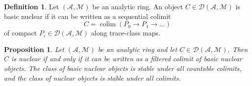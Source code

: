 \documentclass[11pt]{amsbook}
\DeclareMathOperator{\colim}{colim}
\numberwithin{equation}{section}
\numberwithin{theorem}{section}
\newtheorem{proposition}[theorem]{Proposition}
\theoremstyle{definition}
\newtheorem{definition}[theorem]{Definition}
\begin{document}
\begin{definition}\label{def:basicnuclear} Let $(\mathcal A,\mathcal M)$ be an analytic ring. An object $C\in \mathcal D(\mathcal A,\mathcal M)$ is basic nuclear if it can be written as a sequential colimit
\[
C=\colim(P_0\to P_1\to \ldots)
\]
of compact $P_i\in \mathcal D(\mathcal A,\mathcal M)$ along trace-class maps.
\end{definition}

\begin{proposition}\label{prop:nuclear} Let $(\mathcal A,\mathcal M)$ be an analytic ring and let $C\in \mathcal D(\mathcal A,\mathcal M)$. Then $C$ is nuclear if and only if it can be written as a filtered colimit of basic nuclear objects. The class of basic nuclear objects is stable under all countable colimits, and the class of nuclear objects is stable under all colimits.
\end{proposition}
\end{document}
